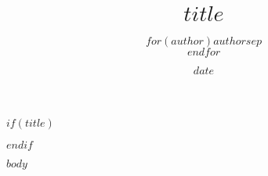 \documentclass{ctexart}
\title{$title$}
\author{$for(author)$$author$$sep$\\$endfor$}
\date{$date$}
\begin{document}
\CTEXnoindent
\setlength{\parskip}{1em}

$if(title)$
\maketitle
\newpage
$endif$

$body$
\end{document}
